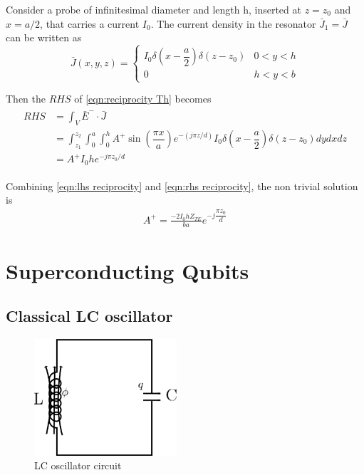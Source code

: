 Consider a probe of infinitesimal diameter and length h, inserted at $z=z_0$ and $x=a/2$, that carries a current $I_0$. The current density in the resonator $\bar{J}_1=\bar{J}$ can be written as
\begin{equation}
\bar{J}(x,y,z)=
\begin{cases}
I_0\delta\left(x-\dfrac{a}{2}\right)\delta(z-z_0)&0<y<h\\
0&h<y<b
\end{cases}
\end{equation}

Then the $RHS$ of \ref{eqn:reciprocity Th} becomes
\begin{align}
\begin{split}
\label{eqn:rhs reciprocity}
RHS&=\int_V\bar{E}^-\cdot\bar{J}\\
&=\int^{z_2}_{z_1}\int^a_0\int^h_0 A^+\sin\left(\dfrac{\pi x}{a}\right)e^{-(j\pi z/d)}I_0\delta\left(x-\dfrac{a}{2}\right)\delta(z-z_0)dydxdz\\
&=A^+I_0he^{-j\pi z_0/d}
\end{split}
\end{align}

Combining \ref{eqn:lhs reciprocity} and \ref{eqn:rhs reciprocity}, the non trivial solution is
\begin{align}
A^+=\frac{-2I_0hZ_{TE}}{ba}e^{-j\dfrac{\pi z_0}{d}}
\end{align}

\fi

\section{Superconducting Qubits}

\subsection{Classical LC oscillator}

\begin{figure}
\centering
\includegraphics[width=150pt]{Figures/LC_oscillator}
\decoRule
\caption[LC oscillator]{LC oscillator circuit}
\label{fig:LC oscillator}
\end{figure}

